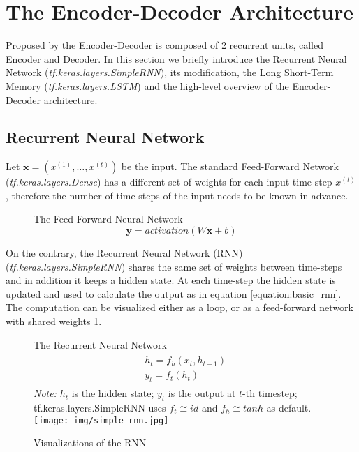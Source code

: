 \section {The Encoder-Decoder Architecture}

Proposed by \citep{sutskever2014sequence} the Encoder-Decoder is composed of 2 recurrent units, called Encoder and Decoder. In this section we briefly introduce the Recurrent Neural Network (\emph{tf.keras.layers.SimpleRNN}), its modification, the Long Short-Term Memory (\emph{tf.keras.layers.LSTM}) \citep{hochreiter1997} and the high-level overview of the Encoder-Decoder architecture.

\subsection{Recurrent Neural Network}

Let $\boldsymbol{x}=(x^{(1)},\dots,x^{(t)})$ be the input. The standard Feed-Forward Network (\emph{tf.keras.layers.Dense}) has a different set of weights for each input time-step $x^{(t)}$, therefore the number of time-steps of the input needs to be known in advance.

\begin{figure}[!h]
\centering
The Feed-Forward Neural Network
\begin{equation}
\boldsymbol{y} = activation(W\boldsymbol{x} + b) \mbox{}
\end{equation}
\end{figure}
On the contrary, the Recurrent Neural Network (RNN) \citep{rumelhart_rnn1988} (\emph{tf.keras.layers.SimpleRNN}) shares the same set of weights between time-steps and in addition it keeps a hidden state. At each time-step the hidden state is updated and used to calculate the output as in equation \ref{equation:basic_rnn}. The computation can be visualized either as a loop, or as a feed-forward network with shared weights \ref{figure:visualization_rnn}.


\begin{figure}[!h]
    \centering
    The Recurrent Neural Network
    \begin{align} \label{equation:basic_rnn}
    \begin{split}
        &h_t = f_h(x_t, h_{t-1}) \\
        &y_t = f_t(h_t)
    \end{split}
    \end{align}
    \footnotesize{\textit{Note:} $h_t$ is the hidden state; $y_t$ is the output at $t$-th timestep; tf.keras.layers.SimpleRNN uses $f_t \cong id$ and $f_h \cong tanh$ as default.}
    \texttt{[image: img/simple\_rnn.jpg]}
    \caption{Visualizations of the RNN} \label{figure:visualization_rnn}
\end{figure}

